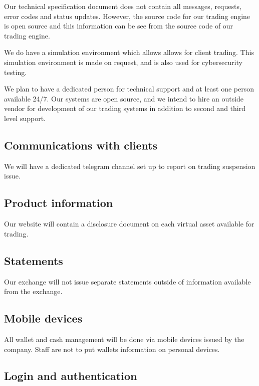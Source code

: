 Our technical specification document does not contain all messages,
requests, error codes and status updates.  However, the source code
for our trading engine is open source and this information can be see
from the source code of our trading engine.

We do have a simulation environment which allows allows for client
trading.  This simulation environment is made on request, and is also
used for cybersecurity testing.

We plan to have a dedicated person for technical support and at least
one person available 24/7.  Our systems are open source, and we intend
to hire an outside vendor for development of our trading systems in
addition to second and third level support.

\subsection{Communications with clients}
We will have a dedicated telegram channel set up to report on trading
suspension issue.

\subsection{Product information}
Our website will contain a disclosure document on each virtual asset
available for trading.

\subsection{Statements}
Our exchange will not issue separate statements outside of information
available from the exchange.

\subsection{Mobile devices}
All wallet and cash management will be done via mobile devices issued
by the company.  Staff are not to put wallets information on personal
devices.

\subsection{Login and authentication}

